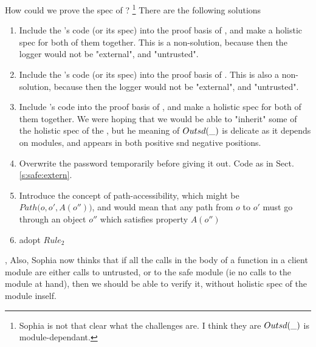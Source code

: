 How could we prove the spec of ? \footnote{\SP Sophia is not that clear what the challenges are.  I think they are $Outsd(\_)$ is module-dependant.} There are the following solutions

\begin{enumerate}
\item
Include the 's code (or its spec) into the proof basis of , and make a holistic spec for both of them together. This is a non-solution, because then the logger would not be "external", and "untrusted".
\item
Include the 's code (or its spec) into the proof basis of . This is also a non-solution, because then the logger would not be "external", and "untrusted".
\item
Include  's code  into the proof basis of , and make a holistic spec for both of them together. We were hoping that we would be able to "inherit" some of the holistic spec of the , \SP but  he meaning of $Outsd(\_)$ is delicate as it depends on modules, and appears in both positive snd negative positions.
\item
Overwrite the password temporarily before giving it out. Code as in Sect. \ref{s:safe:extern}.
\item
Introduce the concept of path-accessibility, which might be $Path( {o}, {o'}, {A(o''))}$, and would mean that any path from $o$ to $o'$  must go through an object $o''$ which satisfies  property $A(o'')$
\item
\SP adopt $Rule_2$

\end{enumerate}

\noindent,
Also, \SP Sophia now thinks that if all the calls in  the body of a function in a client module are either calls to untrusted, or to the safe module (ie no calls to the module at hand), then we should be able to verify it, without holistic spec of the module inself.


